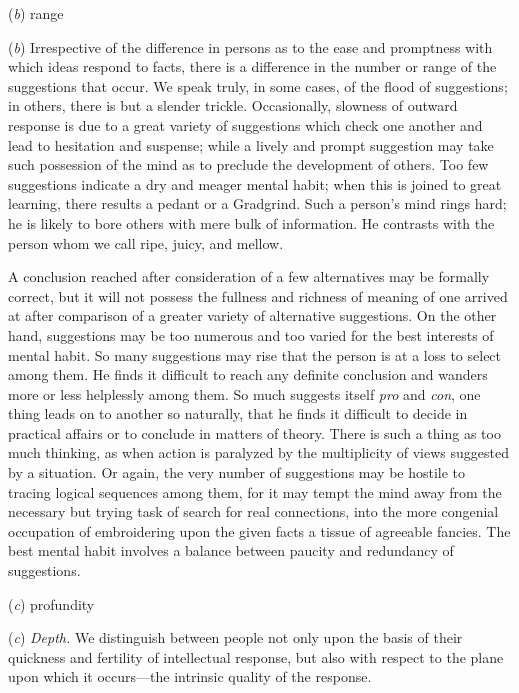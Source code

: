 \documentclass[letterpaper]{book}
\begin{document}
(\emph{b}) range

(\emph{b}) Irrespective of the difference in persons as to the ease and
promptness with which ideas respond to facts, there is a difference in
the number or range of the suggestions that occur. We speak truly, in
some cases, of the flood of suggestions; in others, there is but a
slender trickle. Occasionally, slowness of
outward
response is due to a great variety of suggestions which check one
another and lead to hesitation and suspense; while a lively and prompt
suggestion may take such possession of the mind as to preclude the
development of others. Too few suggestions indicate a dry and meager
mental habit; when this is joined to great learning, there results a
pedant or a Gradgrind. Such a person's mind rings hard; he is likely to
bore others with mere bulk of information. He contrasts with the person
whom we call ripe, juicy, and mellow.

A conclusion reached after consideration of a few alternatives may be
formally correct, but it will not possess the fullness and richness of
meaning of one arrived at after comparison of a greater variety of
alternative suggestions. On the other hand, suggestions may be too
numerous and too varied for the best interests of mental habit. So many
suggestions may rise that the person is at a loss to select among them.
He finds it difficult to reach any definite conclusion and wanders more
or less helplessly among them. So much suggests itself \emph{pro} and
\emph{con}, one thing leads on to another so naturally, that he finds it
difficult to decide in practical affairs or to conclude in matters of
theory. There is such a thing as too much thinking, as when action is
paralyzed by the multiplicity of views suggested by a situation. Or
again, the very number of suggestions may be hostile to tracing logical
sequences among them, for it may tempt the mind away from the necessary
but trying task of search for real connections, into the more congenial
occupation of embroidering upon the given facts a tissue of agreeable
fancies. The best mental habit involves a balance between paucity and
redundancy of
suggestions.

(\emph{c}) profundity

(\emph{c}) \emph{Depth.} We distinguish between people not only upon the
basis of their quickness and fertility of intellectual response, but
also with respect to the plane upon which it occurs---the intrinsic
quality of the response.
\end{document}
